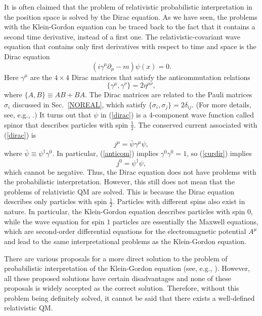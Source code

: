 \documentclass[12pt]{article}
\begin{document}
It is often claimed that the problem of relativistic 
probabilistic interpretation in the position space is solved 
by the Dirac equation. As we have seen, the problems with the 
Klein-Gordon equation can be traced back to the fact that it 
contains a second time derivative, instead of a first one.
The relativistic-covariant wave equation that contains only 
first derivatives with respect to time and space is the
Dirac equation
\begin{equation}\label{dirac}
(i\gamma^{\mu}\partial_{\mu}-m)\psi(x)=0 .
\end{equation}
Here $\gamma^{\mu}$ are the $4\times 4$ Dirac matrices 
that satisfy the anticommutation relations
\begin{equation}\label{anticom}
\{ \gamma^{\mu}, \gamma^{\nu} \}=2\eta^{\mu\nu} ,
\end{equation}            
where $\{A,B\}\equiv AB+BA$.
The Dirac matrices are related to the Pauli matrices $\sigma_i$ 
discussed in Sec.~\ref{NOREAL}, which satisfy 
$\{ \sigma_i, \sigma_j \}=2\delta_{ij}$. (For more details, 
see, e.g., \cite{BD1}.) It turns out that $\psi$ in (\ref{dirac}) 
is a 4-component wave function called spinor that describes particles 
with spin $\frac{1}{2}$. The conserved current associated with 
(\ref{dirac}) is    
\begin{equation}\label{curdir}
j^{\mu}=\bar{\psi}\gamma^{\mu}\psi ,
\end{equation}
where $\bar{\psi}\equiv \psi^{\dagger}\gamma^0$. 
In particular, (\ref{anticom}) implies $\gamma^0\gamma^0=1$, 
so (\ref{curdir}) implies
\begin{equation}
j^0=\psi^{\dagger}\psi ,
\end{equation}
which cannot be negative. Thus, the Dirac equation does not 
have problems with the probabilistic interpretation. 
However, this still does not mean that the problems of 
relativistic QM are solved. This is because the Dirac equation 
describes only particles with spin $\frac{1}{2}$. 
Particles with different spins also exist in nature.
In particular, the Klein-Gordon equation describes particles with  
spin $0$, while the wave equation for spin $1$ particles are 
essentially the Maxwell equations, which are second-order 
differential equations for the electromagnetic potential 
$A^{\mu}$ and lead to the same interpretational problems 
as the Klein-Gordon equation.   

There are various proposals for a more direct solution to the problem of 
probabilistic interpretation of the Klein-Gordon equation
(see, e.g., \cite{newt,ghose,gavr,nikolfpl3,nikolfol}). 
However, all these proposed solutions 
have certain disadvantages and none of these proposals 
is widely accepted as the correct solution.
Therefore, without this problem being 
definitely solved, it cannot be said that there exists a 
well-defined relativistic QM.   
\end{document}
